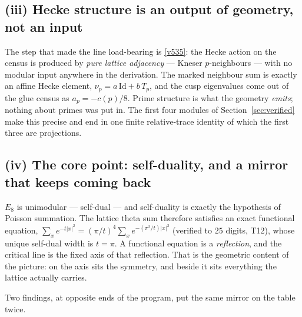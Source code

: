 \documentclass[11pt,a4paper]{article}
\begin{document}
\subsection{(iii) Hecke structure is an output of geometry, not an input}
The step that made the line load-bearing is \vref{v535}: the Hecke action on the census is produced by
\emph{pure lattice adjacency} --- Kneser $p$-neighbours --- with no modular input anywhere in the
derivation. The marked neighbour sum is exactly an affine Hecke element, $\nu_p=a\,\mathrm{Id}+b\,T_p$,
and the cusp eigenvalues come out of the glue census as $a_p=-c(p)/8$. Prime structure is what the
geometry \emph{emits}; nothing about primes was put in. The first four modules of
Section~\ref{sec:verified} make this precise and end in one finite relative-trace identity of which the
first three are projections.

\subsection{(iv) The core point: self-duality, and a mirror that keeps coming back}
$E_8$ is unimodular --- self-dual --- and self-duality is exactly the hypothesis of Poisson summation.
The lattice theta sum therefore satisfies an exact functional equation,
$\sum_x e^{-t|x|^2}=(\pi/t)^4\sum_x e^{-(\pi^2/t)|x|^2}$ (verified to $25$ digits, T12), whose unique
self-dual width is $t=\pi$. A functional equation is a \emph{reflection}, and the critical line is the
fixed axis of that reflection. That is the geometric content of the picture: on the axis sits the
symmetry, and beside it sits everything the lattice actually carries.

Two findings, at opposite ends of the program, put the same mirror on the table twice.
\end{document}
